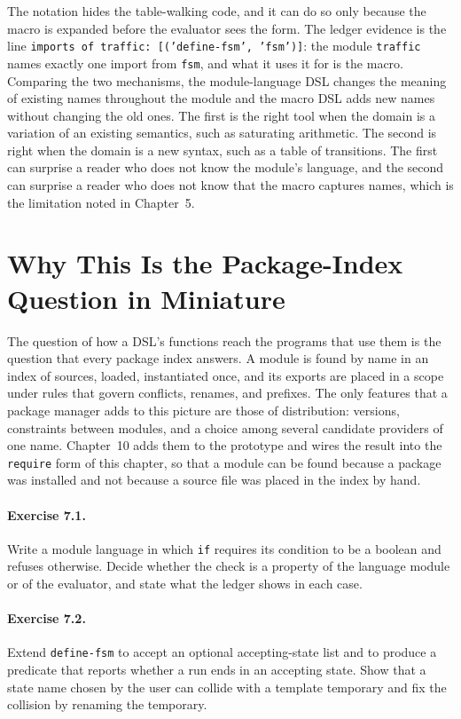 The notation hides the table-walking code, and it can do so only because the macro is expanded before the evaluator sees the form. The ledger evidence is the line \texttt{imports of traffic: [('define-fsm', 'fsm')]}: the module \texttt{traffic} names exactly one import from \texttt{fsm}, and what it uses it for is the macro. Comparing the two mechanisms, the module-language DSL changes the meaning of existing names throughout the module and the macro DSL adds new names without changing the old ones. The first is the right tool when the domain is a variation of an existing semantics, such as saturating arithmetic. The second is right when the domain is a new syntax, such as a table of transitions. The first can surprise a reader who does not know the module's language, and the second can surprise a reader who does not know that the macro captures names, which is the limitation noted in Chapter~5.

\section{Why This Is the Package-Index Question in Miniature}

The question of how a DSL's functions reach the programs that use them is the question that every package index answers. A module is found by name in an index of sources, loaded, instantiated once, and its exports are placed in a scope under rules that govern conflicts, renames, and prefixes. The only features that a package manager adds to this picture are those of distribution: versions, constraints between modules, and a choice among several candidate providers of one name. Chapter~10 adds them to the prototype and wires the result into the \texttt{require} form of this chapter, so that a module can be found because a package was installed and not because a source file was placed in the index by hand.

\paragraph{Exercise 7.1.} Write a module language in which \texttt{if} requires its condition to be a boolean and refuses otherwise. Decide whether the check is a property of the language module or of the evaluator, and state what the ledger shows in each case.

\paragraph{Exercise 7.2.} Extend \texttt{define-fsm} to accept an optional accepting-state list and to produce a predicate that reports whether a run ends in an accepting state. Show that a state name chosen by the user can collide with a template temporary and fix the collision by renaming the temporary.

